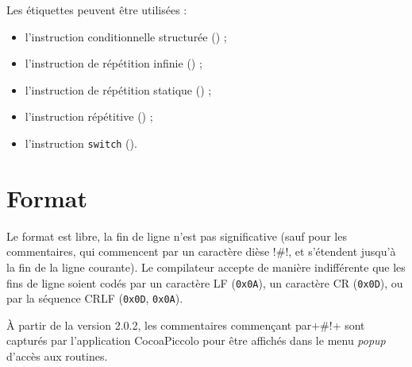 Les étiquettes peuvent être utilisées :
\begin{itemize}
  \item l'instruction conditionnelle structurée () ;
  \item l'instruction de répétition infinie () ;
  \item l'instruction de répétition statique () ;
  \item l'instruction répétitive () ;
  \item l'instruction \texttt{switch} ().


\end{itemize}


\section{Format}

Le format est libre, la fin de ligne n’est pas significative (sauf pour les commentaires, qui commencent par un caractère dièse \pic!#!, et s’étendent jusqu’à la fin de la ligne courante). Le compilateur accepte de manière indifférente que les fins de ligne soient codés par un caractère LF (\texttt{0x0A}), un caractère CR (\texttt{0x0D}), ou par la séquence CRLF (\texttt{0x0D}, \texttt{0x0A}).

À partir de la version 2.0.2, les commentaires commençant par\pic+#!+ sont capturés par l'application CocoaPiccolo pour être affichés dans le menu \emph{popup} d'accès aux routines.

